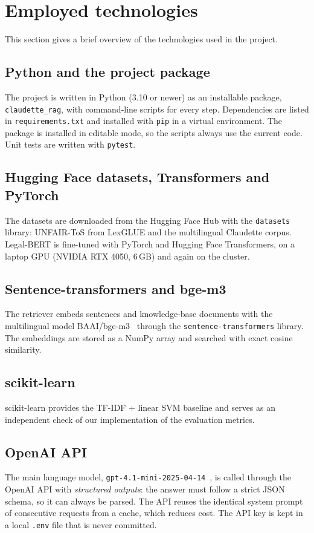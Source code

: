 \section{Employed technologies}
\label{sec:technologies}

This section gives a brief overview of the technologies used in the project.

\subsection{Python and the project package}
The project is written in Python (3.10 or newer) as an installable package, \texttt{claudette\_rag}, with command-line scripts for every step. Dependencies are listed in \texttt{requirements.txt} and installed with \texttt{pip} in a virtual environment. The package is installed in editable mode, so the scripts always use the current code. Unit tests are written with \texttt{pytest}.

\subsection{Hugging Face datasets, Transformers and PyTorch}
The datasets are downloaded from the Hugging Face Hub with the \texttt{datasets} library: UNFAIR-ToS from LexGLUE and the multilingual Claudette corpus. Legal-BERT is fine-tuned with PyTorch and Hugging Face Transformers, on a laptop GPU (NVIDIA RTX 4050, 6\,GB) and again on the cluster.

\subsection{Sentence-transformers and bge-m3}
The retriever embeds sentences and knowledge-base documents with the multilingual model BAAI/bge-m3~\citep{chen2024bgem3} through the \texttt{sentence-transformers} library. The embeddings are stored as a NumPy array and searched with exact cosine similarity.

\subsection{scikit-learn}
scikit-learn provides the TF-IDF + linear SVM baseline and serves as an independent check of our implementation of the evaluation metrics.

\subsection{OpenAI API}
The main language model, \texttt{gpt-4.1-mini-2025-04-14}~\citep{openai2025gpt41}, is called through the OpenAI API with \emph{structured outputs}: the answer must follow a strict JSON schema, so it can always be parsed. The API reuses the identical system prompt of consecutive requests from a cache, which reduces cost. The API key is kept in a local \texttt{.env} file that is never committed.

